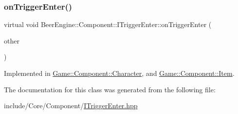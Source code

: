 \subsubsection{\texorpdfstring{on\+Trigger\+Enter()}{onTriggerEnter()}}
{\footnotesize\ttfamily virtual void Beer\+Engine\+::\+Component\+::\+I\+Trigger\+Enter\+::on\+Trigger\+Enter (\begin{DoxyParamCaption}\item[{\mbox{\hyperlink{class_beer_engine_1_1_component_1_1_a_collider}{A\+Collider}} $\ast$}]{other }\end{DoxyParamCaption})\hspace{0.3cm}{\ttfamily [pure virtual]}}



Implemented in \mbox{\hyperlink{class_game_1_1_component_1_1_character_a69ff22151cf9599aab5cbe6929505c8e}{Game\+::\+Component\+::\+Character}}, and \mbox{\hyperlink{class_game_1_1_component_1_1_item_ae5369b261c5d6212de4b3f21ce02c672}{Game\+::\+Component\+::\+Item}}.



The documentation for this class was generated from the following file\+:\begin{DoxyCompactItemize}
\item 
include/\+Core/\+Component/\mbox{\hyperlink{_i_trigger_enter_8hpp}{I\+Trigger\+Enter.\+hpp}}\end{DoxyCompactItemize}
